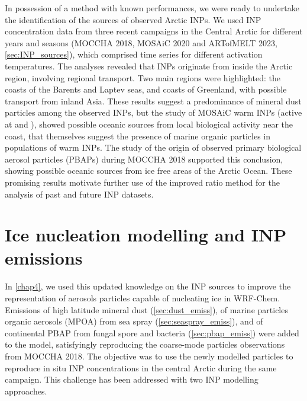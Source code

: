 In possession of a method with known performances, we were ready to undertake the identification of the sources of observed Arctic INPs.
We used INP concentration data from three recent campaigns in the Central Arctic for different years and seasons (MOCCHA 2018, MOSAiC 2020 and ARTofMELT 2023, \cref{sec:INP_sources}), which comprised time series for different activation temperatures.
The analyses revealed that INPs originate from inside the Arctic region, involving regional transport. 
Two main regions were highlighted: the coasts of the Barents and Laptev seas, and coasts of Greenland, with possible transport from inland Asia.
These results suggest a predominance of mineral dust particles among the observed INPs, but the study of MOSAiC warm INPs (active at  and ), showed possible oceanic sources from local biological activity near the coast, that themselves suggest the presence of marine organic particles in populations of warm INPs.
The study of the origin of observed primary biological aerosol particles (PBAPs) during MOCCHA 2018 supported this conclusion, showing possible oceanic sources from ice free areas of the Arctic Ocean.
These promising results motivate further use of the improved ratio method for the analysis of past and future INP datasets. 

\section{Ice nucleation modelling and INP emissions}
In \cref{chap4}, we used this updated knowledge on the INP sources to improve the representation of aerosols particles capable of nucleating ice in WRF-Chem. 
Emissions of high latitude mineral dust (\cref{sec:dust_emiss}), of marine particles organic aerosols (MPOA) from sea spray (\cref{sec:seaspray_emiss}), and of continental PBAP from fungal spore and bacteria (\cref{sec:pbap_emiss}) were added to the model, satisfyingly reproducing the coarse-mode particles observations from MOCCHA 2018.
The objective was to use the newly modelled particles to reproduce in situ INP concentrations in the central Arctic during the same campaign.
This challenge has been addressed with two INP modelling approaches.

